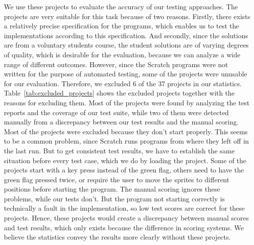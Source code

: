 We use these projects to evaluate the accuracy of our testing approaches.
The projects are very suitable for this task because of two reasons.
Firstly, there exists a relatively precise specification for the programs,
which enables us to test the implementations according to this specification.
And secondly, since the solutions are from a voluntary students course,
the student solutions are of varying degrees of quality,
which is desirable for the evaluation,
because we can analyze a wide range of different outcomes.
However, since the Scratch programs were not written for the purpose of automated testing,
some of the projects were unusable for our evaluation.
Therefore, we excluded $6$ of the 37 projects in our statistics.
Table~\ref{tab:excluded_projects} shows the excluded projects together with the reasons for excluding them.
Most of the projects were found by analyzing the test reports and the coverage of our test suite,
while two of them were detected manually from a discrepancy between our test results and the manual scoring.
Most of the projects were excluded because they don't start properly.
This seems to be a common problem, since Scratch runs programs from where they left off in the last run.
But to get consistent test results, we have to establish the same situation before every test case,
which we do by loading the project.
Some of the projects start with a key press instead of the green flag, others need to have the green flag pressed twice,
or require the user to move the sprites to different positions before starting the program.
The manual scoring ignores these problems, while our tests don't.
But the program not starting correctly is technically a fault in the implementation, so low test scores are correct for these projects.
Hence, these projects would create a discrepancy between manual scores and test results,
which only exists because the difference in scoring systems.
We believe the statistics convey the results more clearly without these projects.

